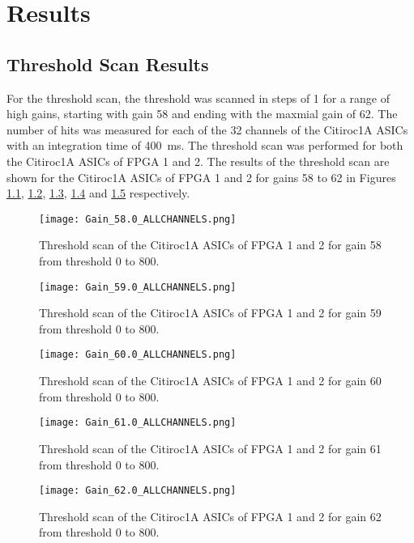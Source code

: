 \chapter{Results}\label{cha:results}
\section{Threshold Scan Results}
For the threshold scan, the threshold was scanned in steps of 1 for a range of high gains,
starting with gain 58 and ending with the maxmial gain of 62.
\newline
The number of hits was measured for each of the 32 channels of the Citiroc1A ASICs with an integration time of \SI{400}{\milli\second}.
The threshold scan was performed for both the Citiroc1A ASICs of FPGA 1 and 2.
\newline
The results of the threshold scan are shown for the Citiroc1A ASICs of FPGA 1 and 2 for gains 58 to 62 in Figures \ref{fig:threshold_scan_58}, \ref{fig:threshold_scan_59}, \ref{fig:threshold_scan_60}, \ref{fig:threshold_scan_61} and \ref{fig:threshold_scan_62} respectively.

    \begin{figure}
        \centering
        \texttt{[image: Gain\_58.0\_ALLCHANNELS.png]}
        \caption{Threshold scan of the Citiroc1A ASICs of FPGA 1 and 2 for gain 58 from threshold 0 to 800.}
        \label{fig:threshold_scan_58}
    \end{figure}
    
    \begin{figure}
        \centering
        \texttt{[image: Gain\_59.0\_ALLCHANNELS.png]}
        \caption{Threshold scan of the Citiroc1A ASICs of FPGA 1 and 2 for gain 59 from threshold 0 to 800.}
        \label{fig:threshold_scan_59}
    \end{figure}
    
    \begin{figure}
        \centering
        \texttt{[image: Gain\_60.0\_ALLCHANNELS.png]}
        \caption{Threshold scan of the Citiroc1A ASICs of FPGA 1 and 2 for gain 60 from threshold 0 to 800.}
        \label{fig:threshold_scan_60}
    \end{figure}
    
    \begin{figure}
        \centering
        \texttt{[image: Gain\_61.0\_ALLCHANNELS.png]}
        \caption{Threshold scan of the Citiroc1A ASICs of FPGA 1 and 2 for gain 61 from threshold 0 to 800.}
        \label{fig:threshold_scan_61}
    \end{figure}
    
    \begin{figure}
        \centering
        \texttt{[image: Gain\_62.0\_ALLCHANNELS.png]}
        \caption{Threshold scan of the Citiroc1A ASICs of FPGA 1 and 2 for gain 62 from threshold 0 to 800.}
        \label{fig:threshold_scan_62}
    \end{figure}
    

     
